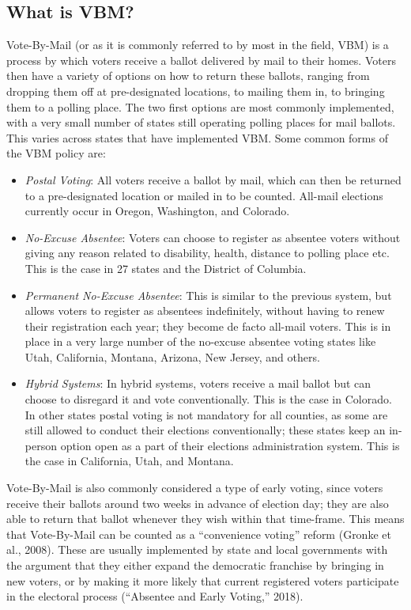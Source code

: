 \documentclass[12pt,twoside]{reedthesis}
\begin{document}
  \subsection{What is VBM?}\label{what-is-vbm}
  
  Vote-By-Mail (or as it is commonly referred to by most in the field,
  VBM) is a process by which voters receive a ballot delivered by mail to
  their homes. Voters then have a variety of options on how to return
  these ballots, ranging from dropping them off at pre-designated
  locations, to mailing them in, to bringing them to a polling place. The
  two first options are most commonly implemented, with a very small
  number of states still operating polling places for mail ballots. This
  varies across states that have implemented VBM. Some common forms of the
  VBM policy are:
  
  \begin{itemize}
  \item
    \emph{Postal Voting}: All voters receive a ballot by mail, which can
    then be returned to a pre-designated location or mailed in to be
    counted. All-mail elections currently occur in Oregon, Washington, and
    Colorado.
  \item
    \emph{No-Excuse Absentee}: Voters can choose to register as absentee
    voters without giving any reason related to disability, health,
    distance to polling place etc. This is the case in 27 states and the
    District of Columbia.
  \item
    \emph{Permanent No-Excuse Absentee}: This is similar to the previous
    system, but allows voters to register as absentees indefinitely,
    without having to renew their registration each year; they become de
    facto all-mail voters. This is in place in a very large number of the
    no-excuse absentee voting states like Utah, California, Montana,
    Arizona, New Jersey, and others.
  \item
    \emph{Hybrid Systems}: In hybrid systems, voters receive a mail ballot
    but can choose to disregard it and vote conventionally. This is the
    case in Colorado. In other states postal voting is not mandatory for
    all counties, as some are still allowed to conduct their elections
    conventionally; these states keep an in-person option open as a part
    of their elections administration system. This is the case in
    California, Utah, and Montana.
  \end{itemize}
  
  Vote-By-Mail is also commonly considered a type of early voting, since
  voters receive their ballots around two weeks in advance of election
  day; they are also able to return that ballot whenever they wish within
  that time-frame. This means that Vote-By-Mail can be counted as a
  ``convenience voting'' reform (Gronke et al., 2008). These are usually
  implemented by state and local governments with the argument that they
  either expand the democratic franchise by bringing in new voters, or by
  making it more likely that current registered voters participate in the
  electoral process (``Absentee and Early Voting,'' 2018).
  
\end{document}
